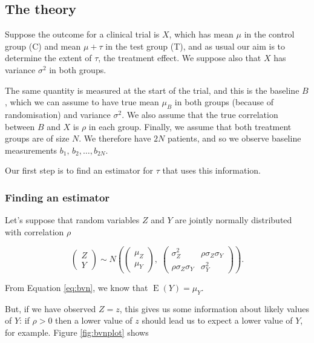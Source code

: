 \documentclass[
  openany]{book}
\theoremstyle{definition}
\theoremstyle{definition}
\theoremstyle{definition}
\theoremstyle{definition}
\theoremstyle{remark}
\begin{document}
\subsection{The theory}\label{ancovatheory}

Suppose the outcome for a clinical trial is \(X\), which has mean \(\mu\) in the control group (C) and mean \(\mu+\tau\) in the test group (T), and as usual our aim is to determine the extent of \(\tau\), the treatment effect. We suppose also that \(X\) has variance \(\sigma^2\) in both groups.

The same quantity is measured at the start of the trial, and this is the baseline \(B\), which we can assume to have true mean \(\mu_B\) in both groups (because of randomisation) and variance \(\sigma^2\). We also assume that the true correlation between \(B\) and \(X\) is \(\rho\) in each group. Finally, we assume that both treatment groups are of size \(N\). We therefore have \(2N\) patients, and so we observe baseline measurements \(b_1,\,b_2,\ldots,b_{2N}\).

Our first step is to find an estimator for \(\tau\) that uses this information.

\subsubsection{Finding an estimator}\label{finding-an-estimator}

Let's suppose that random variables \(Z\) and \(Y\) are jointly normally distributed with correlation \(\rho\)

\begin{equation}
\begin{pmatrix}
Z\\
Y
\end{pmatrix} \sim N\left(
\begin{pmatrix}
\mu_Z\\
\mu_Y
\end{pmatrix},\;
\begin{pmatrix}
\sigma^2_Z & \rho\sigma_Z\sigma_Y \\
\rho\sigma_Z\sigma_Y & \sigma^2_Y
\end{pmatrix}
\right).
\label{eq:bvn}
\end{equation}

From Equation \eqref{eq:bvn}, we know that \(\operatorname{E}\left(Y\right) = \mu_Y\).

But, if we have observed \(Z=z\), this gives us some information about likely values of \(Y\): if \(\rho>0\) then a lower value of \(z\) should lead us to expect a lower value of \(Y\), for example. Figure \ref{fig:bvnplot} shows
\end{document}
